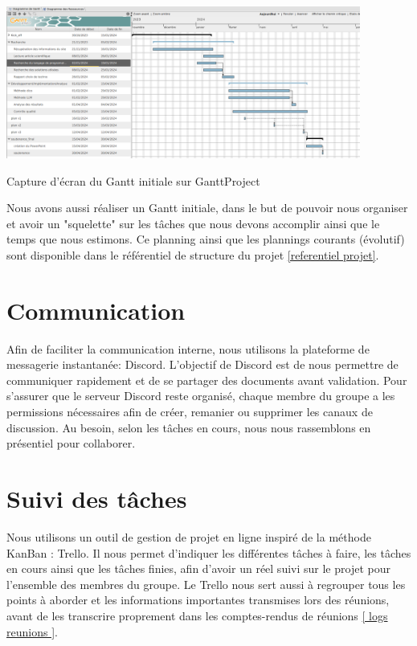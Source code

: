 \documentclass[11pt]{rapport_class}
\begin{document}
\begin{center}
    \includegraphics[height= 5cm]{gantt_initiale.png}\\
    \begin{tiny}
        Capture d'écran du Gantt initiale sur GanttProject
    \end{tiny}
\end{center}
Nous avons aussi réaliser un Gantt initiale, dans le but de pouvoir nous organiser et avoir un "squelette" sur les tâches que nous devons accomplir ainsi que le temps que nous estimons. Ce planning ainsi que les plannings courants (évolutif) sont disponible dans le référentiel de structure du projet \ref{referentiel projet}.

\section{Communication}
\label{ discord interne }
\qquad Afin de faciliter la communication interne, nous utilisons la plateforme de messagerie instantanée: Discord. L'objectif de Discord est de nous permettre de communiquer rapidement et de se partager des documents avant validation. Pour s'assurer que le serveur Discord reste organisé, chaque membre du groupe a les permissions nécessaires afin de créer, remanier ou supprimer les canaux de discussion.
Au besoin, selon les tâches en cours, nous nous rassemblons en présentiel pour collaborer.


\section{Suivi des tâches}
\qquad Nous utilisons un outil de gestion de projet en ligne inspiré de la méthode KanBan : Trello. Il nous permet d’indiquer les différentes tâches à faire, les tâches en cours ainsi que les tâches finies, afin d’avoir un réel suivi sur le projet pour l’ensemble des membres du groupe. Le Trello nous sert aussi à regrouper tous les points à aborder et les informations importantes transmises lors des réunions, avant de les transcrire proprement dans les comptes-rendus de réunions \ref{ logs reunions  }.
\end{document}
